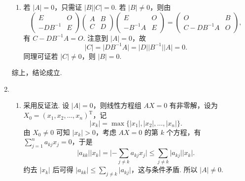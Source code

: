 \begin{enumerate}
\begin{enumerate}
              \item 若 $\lvert A \rvert = 0$，只需证 $\lvert B \rvert \lvert C \rvert = 0$. 若 $\lvert B \rvert \neq 0$，则由
                    \[\begin{pmatrix}
                            E        & O \\
                            -DB^{-1} & E
                        \end{pmatrix} \begin{pmatrix}
                            A & B \\
                            C & D
                        \end{pmatrix} \begin{pmatrix}
                            E        & O \\
                            -B^{-1}A & E
                        \end{pmatrix} = \begin{pmatrix}
                            O          & B \\
                            C-DB^{-1}A & O
                        \end{pmatrix},\]
                    有 $C-DB^{-1}A = O$. 注意到 $\lvert A \rvert = 0$，故 \[\lvert C \rvert = \lvert DB^{-1}A \rvert = \lvert D \rvert \lvert B^{-1} \rvert \lvert A \rvert = 0.\] 同理可证若 $\lvert C \rvert \neq 0$，则 $\lvert B \rvert = 0$.
          \end{enumerate}
          综上，结论成立.

    \item \begin{enumerate}
              \item \label{item:13:B:5:1}
                    采用反证法. 设 $\lvert A \rvert = 0$，则线性方程组 $AX = 0$ 有非零解，设为 $X_0 = (x_1, x_2, \ldots, x_n)^{\mathrm{T}}$，记
                    \[\lvert x_k \rvert = \max \{\lvert x_1 \rvert, \lvert x_2 \rvert, \ldots, \lvert x_n \rvert\}.\]
                    由 $X_0 \neq 0$ 可知 $\lvert x_k \rvert > 0$，考虑 $AX = 0$ 的第 $k$ 个方程，有 $\displaystyle\sum_{j=1}^n a_{kj}x_j = 0$，于是
                    \[\lvert a_{kk} \rvert \lvert x_k \rvert = \lvert -\displaystyle\sum_{j \neq k}a_{kj}x_j \rvert \leqslant \sum_{j \neq k}\lvert a_{kj} \rvert \lvert x_k \rvert.\]
                    约去 $\lvert x_k \rvert$ 后可得 $\lvert a_{kk} \rvert \leqslant \displaystyle\sum_{j \neq k} \lvert a_{kj} \rvert$，这与条件矛盾. 所以 $\lvert A \rvert \neq 0$.


\end{enumerate}
\end{enumerate}
